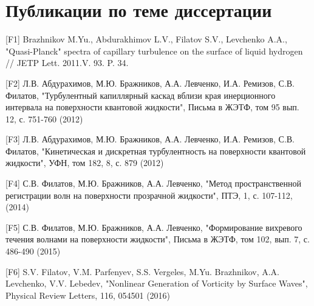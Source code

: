 \clearpage                                  %

\chapter*{Публикации по теме диссертации}						%
%
%
[F1] Brazhnikov M.Yu., Abdurakhimov L.V., Filatov S.V., Levchenko A.A., "Quasi-Planck"  spectra of capillary turbulence on the surface of liquid hydrogen // JETP Lett. 2011.V. 93. P. 34.

[F2] Л.В. Абдурахимов, М.Ю. Бражников, А.А. Левченко, И.А. Ремизов, С.В. Филатов, "Турбулентный капиллярный каскад вблизи края инерционного интервала на поверхности квантовой жидкости", Письма в ЖЭТФ, том 95 вып. 12, с. 751-760 (2012)

[F3] Л.В. Абдурахимов, М.Ю. Бражников, А.А. Левченко, И.А. Ремизов, С.В. Филатов, "Кинетическая и дискретная турбулентность на поверхности квантовой жидкости", УФН, том 182, 8, с. 879 (2012)

[F4] С.В. Филатов, М.Ю. Бражников, А.А. Левченко, "Метод пространственной регистрации волн на поверхности прозрачной жидкости", ПТЭ, 1, с. 107-112, (2014)

[F5] С.В. Филатов, М.Ю. Бражников, А.А. Левченко, "Формирование вихревого течения волнами на поверхности жидкости", Письма в ЖЭТФ, том 102, вып. 7, с. 486-490 (2015)

[F6] S.V. Filatov, V.M. Parfenyev, S.S. Vergeles, M.Yu. Brazhnikov, A.A. Levchenko, V.V. Lebedev, "Nonlinear Generation of Vorticity by Surface Waves", Physical Review Letters, 116, 054501 (2016)

